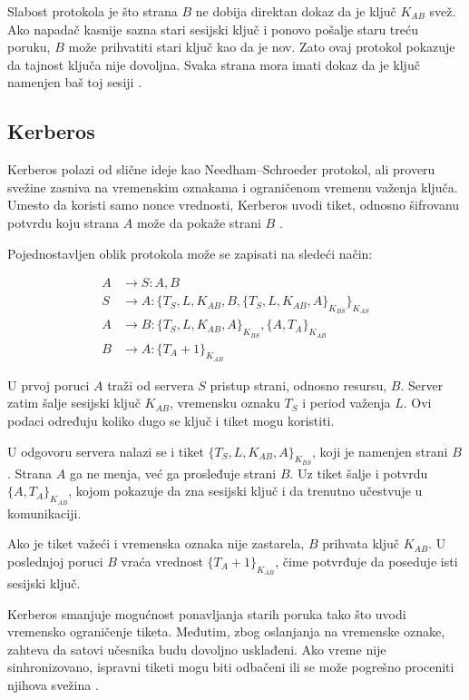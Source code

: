 Slabost protokola je što strana \(B\) ne dobija direktan dokaz da je ključ \(K_{AB}\) svež. Ako napadač kasnije sazna stari sesijski ključ i ponovo pošalje staru treću poruku, \(B\) može prihvatiti stari ključ kao da je nov. Zato ovaj protokol pokazuje da tajnost ključa nije dovoljna. Svaka strana mora imati dokaz da je ključ namenjen baš toj sesiji \cite{smart2016cryptography}.

\subsection{Kerberos}

Kerberos polazi od slične ideje kao Needham--Schroeder protokol, ali proveru svežine zasniva na vremenskim oznakama i ograničenom vremenu važenja ključa. Umesto da koristi samo nonce vrednosti, Kerberos uvodi tiket, odnosno šifrovanu potvrdu koju strana \(A\) može da pokaže strani \(B\) \cite{smart2016cryptography}.

Pojednostavljen oblik protokola može se zapisati na sledeći način:

\[ \begin{aligned} A &\rightarrow S : A, B \\ S &\rightarrow A : \{T_S, L, K_{AB}, B, \{T_S, L, K_{AB}, A\}_{K_{BS}}\}_{K_{AS}} \\ A &\rightarrow B : \{T_S, L, K_{AB}, A\}_{K_{BS}}, \{A, T_A\}_{K_{AB}} \\ B &\rightarrow A : \{T_A + 1\}_{K_{AB}} \end{aligned} \]

U prvoj poruci \(A\) traži od servera \(S\) pristup strani, odnosno resursu, \(B\). Server zatim šalje sesijski ključ \(K_{AB}\), vremensku oznaku \(T_S\) i period važenja \(L\). Ovi podaci određuju koliko dugo se ključ i tiket mogu koristiti.

U odgovoru servera nalazi se i tiket \(\{T_S, L, K_{AB}, A\}_{K_{BS}}\), koji je namenjen strani \(B\). Strana \(A\) ga ne menja, već ga prosleđuje strani \(B\). Uz tiket šalje i potvrdu \(\{A, T_A\}_{K_{AB}}\), kojom pokazuje da zna sesijski ključ i da trenutno učestvuje u komunikaciji.

Ako je tiket važeći i vremenska oznaka nije zastarela, \(B\) prihvata ključ \(K_{AB}\). U poslednjoj poruci \(B\) vraća vrednost \(\{T_A + 1\}_{K_{AB}}\), čime potvrđuje da poseduje isti sesijski ključ.

Kerberos smanjuje mogućnost ponavljanja starih poruka tako što uvodi vremensko ograničenje tiketa. Međutim, zbog oslanjanja na vremenske oznake, zahteva da satovi učesnika budu dovoljno usklađeni. Ako vreme nije sinhronizovano, ispravni tiketi mogu biti odbačeni ili se može pogrešno proceniti njihova svežina \cite{smart2016cryptography}.



